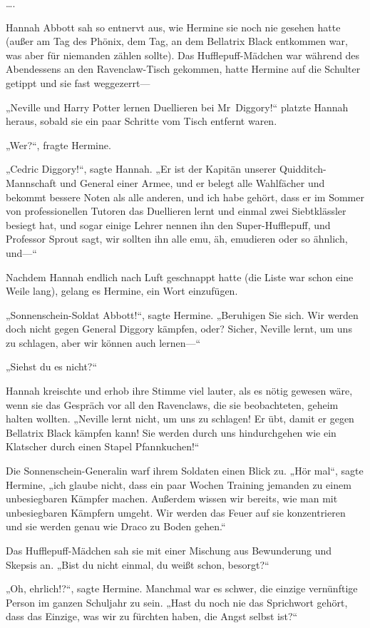 {….

Hannah Abbott sah so entnervt aus, wie Hermine sie noch nie gesehen hatte (außer am Tag des Phönix, dem Tag, an dem Bellatrix Black entkommen war, was aber für niemanden zählen sollte). Das Hufflepuff-Mädchen war während des Abendessens an den Ravenclaw-Tisch gekommen, hatte Hermine auf die Schulter getippt und sie fast weggezerrt—

„Neville und Harry Potter lernen Duellieren bei Mr~Diggory!“ platzte Hannah heraus, sobald sie ein paar Schritte vom Tisch entfernt waren.

„Wer?“, fragte Hermine.

„Cedric Diggory!“, sagte Hannah. „Er ist der Kapitän unserer Quidditch-Mannschaft und General einer Armee, und er belegt alle Wahlfächer und bekommt bessere Noten als alle anderen, und ich habe gehört, dass er im Sommer von professionellen Tutoren das Duellieren lernt und einmal zwei Siebtklässler besiegt hat, und sogar einige Lehrer nennen ihn den Super-Hufflepuff, und Professor Sprout sagt, wir sollten ihn alle emu, äh, emudieren oder so ähnlich, und—“

Nachdem Hannah endlich nach Luft geschnappt hatte (die Liste war schon eine Weile lang), gelang es Hermine, ein Wort einzufügen.

„Sonnenschein-Soldat Abbott!“, sagte Hermine. „Beruhigen Sie sich. Wir werden doch nicht gegen General Diggory kämpfen, oder? Sicher, Neville lernt, um uns zu schlagen, aber wir können auch lernen—“

„Siehst du es nicht?“

Hannah kreischte und erhob ihre Stimme viel lauter, als es nötig gewesen wäre, wenn sie das Gespräch vor all den Ravenclaws, die sie beobachteten, geheim halten wollten. „Neville lernt nicht, um uns zu schlagen! Er übt, damit er gegen Bellatrix Black kämpfen kann! Sie werden durch uns hindurchgehen wie ein Klatscher durch einen Stapel Pfannkuchen!“

Die Sonnenschein-Generalin warf ihrem Soldaten einen Blick zu. „Hör mal“, sagte Hermine, „ich glaube nicht, dass ein paar Wochen Training jemanden zu einem unbesiegbaren Kämpfer machen. Außerdem wissen wir bereits, wie man mit unbesiegbaren Kämpfern umgeht. Wir werden das Feuer auf sie konzentrieren und sie werden genau wie Draco zu Boden gehen.“

Das Hufflepuff-Mädchen sah sie mit einer Mischung aus Bewunderung und Skepsis an. „Bist du nicht einmal, du weißt schon, besorgt?“

„Oh, ehrlich!?“, sagte Hermine. Manchmal war es schwer, die einzige vernünftige Person im ganzen Schuljahr zu sein. „Hast du noch nie das Sprichwort gehört, dass das Einzige, was wir zu fürchten haben, die Angst selbst ist?“

}
